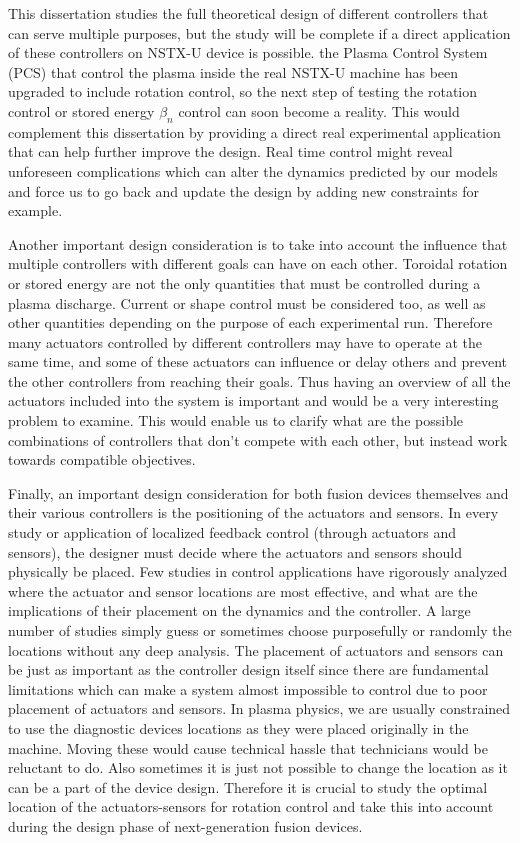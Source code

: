 \documentclass[12pt,lot, lof]{puthesis}
\begin{document}
This dissertation studies the full theoretical design of different controllers that can serve multiple purposes, but the study will be complete if a direct application of these controllers on NSTX-U device is possible.
the Plasma Control System (PCS) that control the plasma inside the real NSTX-U machine has been upgraded to include rotation control, so the next step of testing the rotation control or stored energy $\beta_n$ control can soon become a reality.
This would complement this dissertation by providing a direct real experimental application that can help further improve the design.
Real time control might reveal unforeseen complications which can alter the dynamics predicted by our models and force us to go back and update the design by adding new constraints for example.

Another important design consideration is to take into account the influence that multiple controllers with different goals can have on each other.
Toroidal rotation or stored energy are not the only quantities that must be controlled during a plasma discharge.
Current or shape control must be considered too, as well as other quantities depending on the purpose of each experimental run.
Therefore many actuators controlled by different controllers may have to operate at the same time, and some of these actuators can influence or delay others and prevent the other controllers from reaching their goals.
Thus having an overview of all the actuators included into the system is important and would be a very interesting problem to examine.
This would enable us to clarify what are the possible combinations of controllers that don't compete with each other, but instead work towards compatible objectives.

Finally, an important design consideration for both fusion devices themselves and their various controllers is the positioning of the actuators and sensors.
In every study or application of localized feedback control (through actuators and sensors), the designer must decide where the actuators and sensors should physically be placed.
Few studies in control applications have rigorously analyzed where the actuator and sensor locations are most effective, and what are the implications of their placement on the dynamics and the controller. A large number of studies simply guess or sometimes choose purposefully or randomly the locations without any deep analysis.
The placement of actuators and sensors can be just as important as the controller design itself since there are fundamental limitations which can make a system almost impossible to control due to poor placement of actuators and sensors.
In plasma physics, we are usually constrained to use the diagnostic devices locations as they were placed originally in the machine. Moving these would cause technical hassle that technicians would be reluctant to do. Also sometimes it is just not possible to change the location as it can be a part of the device design.
Therefore it is crucial to study the optimal location of the actuators-sensors for rotation control and take this into account during the design phase of next-generation fusion devices.
\end{document}
